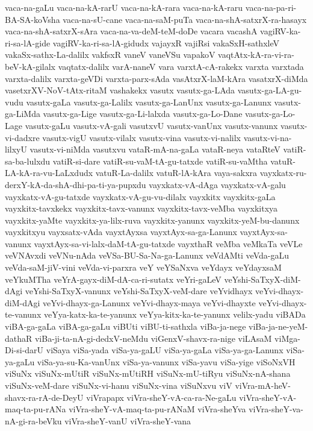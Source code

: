 {vaca-na-gaLu
vaca-na-kA-rarU
vaca-na-kA-rara
vaca-na-kA-raru
vaca-na-pa-ri-BA-SA-koVsha
vaca-na-sU-cane
vaca-na-saM-puTa
vaca-na-shA-satxrX-ra-hasayx
vaca-na-shA-satxrX-sAra
vaca-na-va-deM-teM-doDe
vacara
vacashA
vagiRV-ka-ri-sa-lA-gide
vagiRV-ka-ri-sa-lA-gidudx
vajayxR
vajiRsi
vakaSxH-sathxleV
vakaSx-sathx-La-dalilx
vakfsxR
vaneV
vaneVSu
vapakoV
vaqtAtx-kA-ra-vi-ra-beV-kA-gilalx
vaqtatx-dalilx
varA-naneV
vara
varxtA-cA-rakekx
varxta
varxtada
varxta-dalilx
varxta-geVDi
varxta-parx-sAda
vasAtxrX-laM-kAra
vasatxrX-diMda
vasetxrXV-NoV-tAtx-ritaM
vashakekx
vasutx
vasutx-ga-LAda
vasutx-ga-LA-gu-vudu
vasutx-gaLa
vasutx-ga-Lalilx
vasutx-ga-LanUnx
vasutx-ga-Lanunx
vasutx-ga-LiMda
vasutx-ga-Lige
vasutx-ga-Li-lalxda
vasutx-ga-Lo-Dane
vasutx-ga-Lo-Lage
vasutx-gaLu
vasutx-vA-gali
vasutxvU
vasutx-vanUnx
vasutx-vanunx
vasutx-vi-dadxre
vasutx-vigU
vasutx-vilalx
vasutx-vina
vasutx-vi-nalilx
vasutx-vi-na-lilxyU
vasutx-vi-niMda
vasutxvu
vataR-mA-na-gaLa
vataR-neya
vataRteV
vatiR-sa-ba-lulxdu
vatiR-si-dare
vatiR-su-vaM-tA-gu-tatxde
vatiR-su-vaMtha
vatuR-LA-kA-ra-vu-LaLxdudx
vatuR-La-dalilx
vatuR-lA-kAra
vaya-sakxra
vayxkatx-ru-derxY-kA-da-shA-dhi-pa-ti-ya-pupxdu
vayxkatx-vA-dAga
vayxkatx-vA-galu
vayxkatx-vA-gu-tatxde
vayxkatx-vA-gu-vu-dilalx
vayxkitx
vayxkitx-gaLa
vayxkitx-tavxkekx
vayxkitx-tavx-vanunx
vayxkitx-tavx-veMba
vayxkitxya
vayxkitx-yaMte
vayxkitx-ya-lilx-ruva
vayxkitx-yanunx
vayxkitx-yeM-bu-danunx
vayxkitxyu
vayxsatx-vAda
vayxtAyxsa
vayxtAyx-sa-ga-Lanunx
vayxtAyx-sa-vanunx
vayxtAyx-sa-vi-lalx-daM-tA-gu-tatxde
vayxthaR
veMba
veMkaTa
veVLe
veVNAvxdi
veVNu-nAda
veVSa-BU-Sa-Na-ga-Lanunx
veVdAMti
veVda-gaLu
veVda-saM-jiV-vini
veVda-vi-parxra
veY
veYSaNxva
veYdayx
veYdayxsaM
veYkuMTha
veYrA-gayx-diM-dA-ca-ri-sutatx
veYri-gaLeV
veYshi-SaTxyX-diM-dAgi
veYshi-SaTxyX-vanunx
veYshi-SaTxyX-veM-dare
veYvidhayx
veYvi-dhayx-diM-dAgi
veYvi-dhayx-ga-Lanunx
veYvi-dhayx-maya
veYvi-dhayxte
veYvi-dhayx-te-vanunx
veYya-katx-ka-te-yanunx
veYya-kitx-ka-te-yanunx
velilx-yadu
viBADa
viBA-ga-gaLa
viBA-ga-gaLu
viBUti
viBU-ti-sathxla
viBa-ja-nege
viBa-ja-ne-yeM-dathaR
viBa-ji-ta-nA-gi-dedxV-neMdu
viGenxV-shavx-ra-nige
viLAsaM
viMga-Di-si-darU
viSaya
viSa-yada
viSa-ya-gaLU
viSa-ya-gaLa
viSa-ya-ga-Lanunx
viSa-ya-gaLu
viSa-ya-su-Ka-vanUnx
viSa-ya-vanunx
viSa-yavu
viSa-yige
viSoNxVH
viSuNx
viSuNx-mUtiR
viSuNx-mUtiRH
viSuNx-mU-tiRyu
viSuNx-nA-shana
viSuNx-veM-dare
viSuNx-vi-hanu
viSuNx-vina
viSuNxvu
viV
viVra-mA-heV-shavx-ra-rA-de-DeyU
viVrapapx
viVra-sheY-vA-ca-ra-Ne-gaLu
viVra-sheY-vA-maq-ta-pu-rANa
viVra-sheY-vA-maq-ta-pu-rANaM
viVra-sheYva
viVra-sheY-va-nA-gi-ra-beVku
viVra-sheY-vanU
viVra-sheY-vana
}
